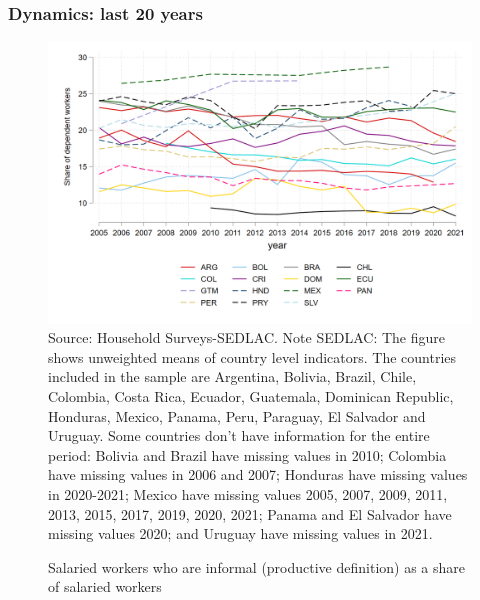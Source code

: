 \documentclass{beamer}
\begin{document}
\begin{frame}
\frametitle{Dynamics: last 20 years}
\begin{figure}[!htb]
        \justifying
        \caption{Salaried workers who are informal (productive definition) as a share of salaried workers}     
        \includegraphics[scale=.2]{latex/figures/Evolution/informal_pr_se_all.png}
        \label{fig:Evolution_informalprse}
        \footnotesize{Source: Household Surveys-SEDLAC.}
       \footnotesize{Note SEDLAC: The figure shows unweighted means of country level indicators. The countries included in the sample are Argentina, Bolivia, Brazil, Chile, Colombia, Costa Rica, Ecuador, Guatemala, Dominican Republic, Honduras, Mexico, Panama, Peru, Paraguay, El Salvador and Uruguay. Some countries don’t have information for the entire period: Bolivia and Brazil have missing values in 2010; Colombia have missing values in 2006 and 2007; Honduras have missing values in 2020-2021; Mexico have missing values 2005, 2007, 2009, 2011, 2013, 2015, 2017, 2019, 2020, 2021; Panama and El Salvador have missing values 2020; and Uruguay have missing values in 2021.}
 \end{figure}
 \end{frame}
\end{document}
